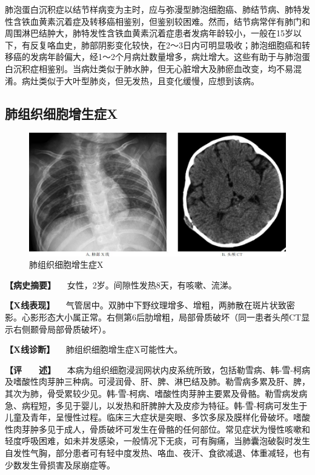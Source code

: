 肺泡蛋白沉积症以结节样病变为主时，应与弥漫型肺泡细胞癌、肺结节病、肺特发性含铁血黄素沉着症及转移癌相鉴别，但鉴别较困难。然而，结节病常伴有肺门和周围淋巴结肿大，肺特发性含铁血黄素沉着症患者发病年龄较小，一般在15岁以下，有反复咯血史，肺部阴影变化较快，在2～3日内可明显吸收；肺泡细胞癌和转移癌的发病年龄偏大，经1～2个月病灶数量增多，病灶增大。这些有助于与肺泡蛋白沉积症相鉴别。当病灶类似于肺水肿，但无心脏增大及肺瘀血改变，均不易混淆。病灶类似于大叶型肺炎，但无发热，且变化缓慢，应想到该病。

\subsection{肺组织细胞增生症X}

\begin{figure}[!htbp]
 \centering
 \includegraphics{./images/Image00184.jpg}
 \captionsetup{justification=centering}
 \caption{肺组织细胞增生症X}
 \label{fig3-10-5}
  \end{figure} 

\textbf{【病史摘要】} 　女性，2岁。间隙性发热8天，有咳嗽、流涕。

\textbf{【X线表现】}
　气管居中。双肺中下野纹理增多、增粗，两肺散在斑片状致密影。心影形态大小属正常。右侧第6后肋增粗，局部骨质破坏（同一患者头颅CT显示右侧颞骨局部骨质破坏）。

\textbf{【X线诊断】} 　肺组织细胞增生症X可能性大。

\textbf{【评　　述】}
　本病为组织细胞浸润网状内皮系统所致，包括勒雪病、韩-雪-柯病及嗜酸性肉芽肿三种病。可浸润骨、肝、脾、淋巴结及肺。勒雪病多累及肝、脾，其次为肺，骨受累较少见。韩-雪-柯病、嗜酸性肉芽肿主要累及骨骼。勒雪病发病急、病程短，多见于婴儿，以发热和肝脾肿大及皮疹为特征。韩-雪-柯病可发生于儿童及青年，呈慢性过程。临床三大症状是突眼、多饮多尿及膜样化骨破坏。嗜酸性肉芽肿多见于成人，骨质破坏可发生在骨骼的任何部位。常见症状为慢性咳嗽和轻度呼吸困难，如未并发感染，一般情况下无痰，可有胸痛，当肺囊泡破裂时发生自发性气胸，部分患者可有轻中度发热、咯血、夜汗、食欲减退、体重减轻，也有少数发生骨损害及尿崩症等。

